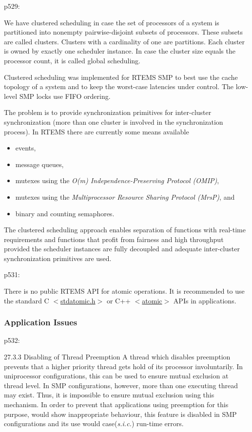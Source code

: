 p529:

We have clustered scheduling in case
the set of processors of a system is partitioned
into nonempty pairwise-disjoint subsets of processors.
These subsets are called clusters.
Clusters with a cardinality of one are partitions.
Each cluster is owned by exactly one scheduler instance.
In case the cluster size equals the processor count,
it is called global scheduling.

Clustered scheduling was implemented for RTEMS SMP
to best use the cache topology of a system
and to keep the worst-case latencies under control.
The low-level SMP locks use FIFO ordering.

The problem is to provide synchronization primitives
for inter-cluster synchronization
(more than one cluster is involved in the synchronization process).
In RTEMS there are currently some means available
\begin{itemize}
  \item events,
  \item message queues,
  \item mutexes using the \emph{O(m) Independence-Preserving Protocol (OMIP)},
  \item
    mutexes using the \emph{Multiprocessor Resource Sharing Protocol (MrsP)},
    and
  \item binary and counting semaphores.
\end{itemize}
The clustered scheduling approach enables separation of functions
with real-time requirements
and functions that profit from fairness and high throughput
provided the scheduler instances are fully decoupled
and adequate inter-cluster synchronization primitives are used.

p531:

There is no public RTEMS API for atomic operations.
It is recommended to use the standard C
\href{https://en.cppreference.com/w/c/atomic}{$<$stdatomic.h$>$}
or C++ \href{https://en.cppreference.com/w/cpp/atomic/atomic}{$<$atomic$>$}
APIs in applications.

\subsubsection{Application Issues}

p532:

27.3.3 Disabling of Thread Preemption
A thread which disables preemption prevents
that a higher priority thread gets hold of its processor involuntarily.
In uniprocessor configurations,
this can be used to ensure mutual exclusion at thread level.
In SMP configurations,
however,
more than one executing thread may exist.
Thus,
it is impossible to ensure mutual exclusion using this mechanism.
In order to prevent that applications using preemption for this purpose,
would show inappropriate behaviour,
this feature is disabled in SMP configurations
and its use would case(\emph{s.i.c.}) run-time errors.

